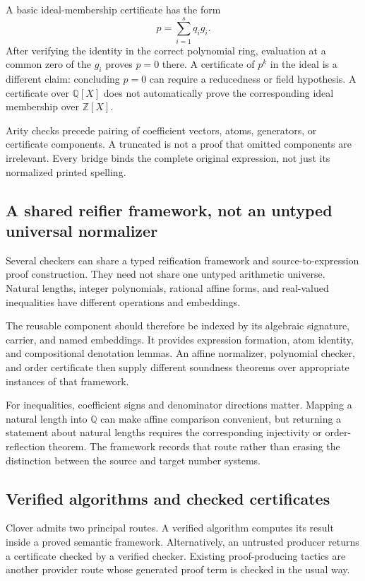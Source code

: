 \documentclass[11pt,a4paper]{article}
\newcommand{\code}[1]{\texttt{\detokenize{#1}}}
\newcommand{\Z}{\mathbb Z}
\newcommand{\Q}{\mathbb Q}
\theoremstyle{definition}
\theoremstyle{remark}
\begin{document}
A basic ideal-membership certificate has the form
\[
 p=\sum_{i=1}^s q_i g_i.
\]
After verifying the identity in the correct polynomial ring, evaluation at a
common zero of the $g_i$ proves $p=0$ there. A certificate of $p^k$ in the ideal
is a different claim: concluding $p=0$ can require a reducedness or field
hypothesis. A certificate over $\Q[X]$ does not automatically prove the
corresponding ideal membership over $\Z[X]$.

Arity checks precede pairing of coefficient vectors, atoms, generators, or
certificate components. A truncated \code{zip} is not a proof that omitted
components are irrelevant. Every bridge binds the complete original expression,
not just its normalized printed spelling.

\subsection{A shared reifier framework, not an untyped universal normalizer}

Several checkers can share a typed reification framework and source-to-expression
proof construction. They need not share one untyped arithmetic universe.
Natural lengths, integer polynomials, rational affine forms, and real-valued
inequalities have different operations and embeddings.

The reusable component should therefore be indexed by its algebraic signature,
carrier, and named embeddings. It provides expression formation, atom identity,
and compositional denotation lemmas. An affine normalizer, polynomial checker,
and order certificate then supply different soundness theorems over appropriate
instances of that framework.

For inequalities, coefficient signs and denominator directions matter. Mapping
a natural length into $\Q$ can make affine comparison convenient, but returning
a statement about natural lengths requires the corresponding injectivity or
order-reflection theorem. The framework records that route rather than erasing
the distinction between the source and target number systems.

\subsection{Verified algorithms and checked certificates}

Clover admits two principal routes. A verified algorithm computes its result
inside a proved semantic framework. Alternatively, an untrusted producer returns
a certificate checked by a verified checker. Existing proof-producing tactics
are another provider route whose generated proof term is checked in the usual
way.
\end{document}
